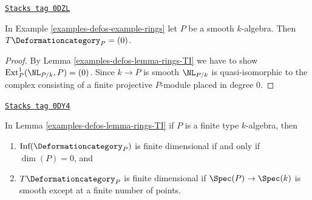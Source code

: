 \begin{lemma}[Smooth]
\label{examples-defos-lemma-smooth}
\href{https://stacks.math.columbia.edu/tag/0DZL}{\texttt{Stacks tag 0DZL}}

In Example \ref{examples-defos-example-rings} let $P$ be a smooth $k$-algebra. Then
$T\Deformationcategory_P = (0)$.
\end{lemma}

\begin{proof}
By Lemma \ref{examples-defos-lemma-rings-TI} we have to show
$\text{Ext}^1_P(\NL_{P/k}, P) = (0)$.
Since $k \to P$ is smooth $\NL_{P/k}$ is quasi-isomorphic to the
complex consisting of a finite projective
$P$-module placed in degree $0$.
\end{proof}

\begin{lemma}
\label{examples-defos-lemma-finite-type-rings-TI}
\href{https://stacks.math.columbia.edu/tag/0DY4}{\texttt{Stacks tag 0DY4}}

In Lemma \ref{examples-defos-lemma-rings-TI} if $P$ is a finite type $k$-algebra, then
\begin{enumerate}
\item $\text{Inf}(\Deformationcategory_P)$ is finite dimensional if and only if
$\dim(P) = 0$, and
\item $T\Deformationcategory_P$ is finite dimensional if
$\Spec(P) \to \Spec(k)$ is smooth except at a finite number of points.
\end{enumerate}
\end{lemma}

